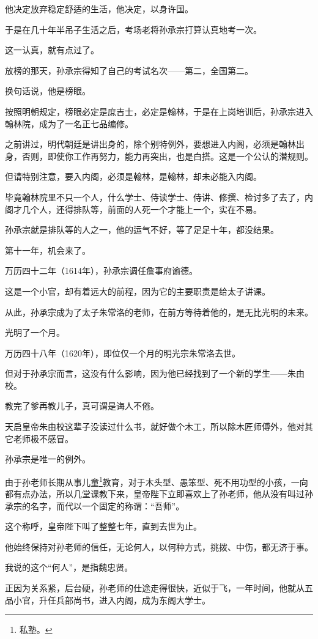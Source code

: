 \begin{multicols}{\theparacolNo}
他决定放弃稳定舒适的生活，他决定，以身许国。

于是在几十年半吊子生活之后，考场老将孙承宗打算认真地考一次。

这一认真，就有点过了。

放榜的那天，孙承宗得知了自己的考试名次——第二，全国第二。

换句话说，他是榜眼。

按照明朝规定，榜眼必定是庶吉士，必定是翰林，于是在上岗培训后，孙承宗进入翰林院，成为了一名正七品编修。

之前讲过，明代朝廷是讲出身的，除个别特例外，要想进入内阁，必须是翰林出身，否则，即使你工作再努力，能力再突出，也是白搭。这是一个公认的潜规则。

但请特别注意，要入内阁，必须是翰林，是翰林，却未必能入内阁。

毕竟翰林院里不只一个人，什么学士、侍读学士、侍讲、修撰、检讨多了去了，内阁才几个人，还得排队等，前面的人死一个才能上一个，实在不易。

孙承宗就是排队等的人之一，他的运气不好，等了足足十年，都没结果。

第十一年，机会来了。

万历四十二年（1614年），孙承宗调任詹事府谕德。

这是一个小官，却有着远大的前程，因为它的主要职责是给太子讲课。

从此，孙承宗成为了太子朱常洛的老师，在前方等待着他的，是无比光明的未来。

光明了一个月。

万历四十八年（1620年），即位仅一个月的明光宗朱常洛去世。

但对于孙承宗而言，这没有什么影响，因为他已经找到了一个新的学生——朱由校。

教完了爹再教儿子，真可谓是诲人不倦。

天启皇帝朱由校这辈子没读过什么书，就好做个木工，所以除木匠师傅外，他对其它老师极不感冒。

孙承宗是唯一的例外。

由于孙老师长期从事儿童\footnote{私塾。}教育，对于木头型、愚笨型、死不用功型的小孩，一向都有点办法，所以几堂课教下来，皇帝陛下立即喜欢上了孙老师，他从没有叫过孙承宗的名字，而代以一个固定的称谓：“吾师”。

这个称呼，皇帝陛下叫了整整七年，直到去世为止。

他始终保持对孙老师的信任，无论何人，以何种方式，挑拨、中伤，都无济于事。

我说的这个“何人”，是指魏忠贤。

正因为关系紧，后台硬，孙老师的仕途走得很快，近似于飞，一年时间，他就从五品小官，升任兵部尚书，进入内阁，成为东阁大学士。


\end{multicols}

